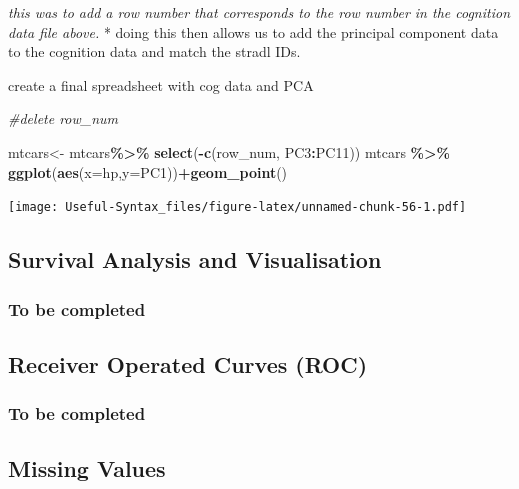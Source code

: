 \documentclass[
]{article}
\newenvironment{Shaded}{\begin{snugshade}}{\end{snugshade}}
\newcommand{\AttributeTok}[1]{\textcolor[rgb]{0.13,0.29,0.53}{#1}}
\newcommand{\CommentTok}[1]{\textcolor[rgb]{0.56,0.35,0.01}{\textit{#1}}}
\newcommand{\FunctionTok}[1]{\textcolor[rgb]{0.13,0.29,0.53}{\textbf{#1}}}
\newcommand{\NormalTok}[1]{#1}
\newcommand{\OtherTok}[1]{\textcolor[rgb]{0.56,0.35,0.01}{#1}}
\newcommand{\SpecialCharTok}[1]{\textcolor[rgb]{0.81,0.36,0.00}{\textbf{#1}}}
\begin{document}
\emph{this was to add a row number that corresponds to the row number in the cognition data file above.}
* doing this then allows us to add the principal component data to the cognition data and match the stradl IDs.

create a final spreadsheet with cog data and PCA

\begin{Shaded}
\begin{Highlighting}[]
\CommentTok{\#delete row\_num}

\NormalTok{mtcars}\OtherTok{\textless{}{-}}\NormalTok{ mtcars}\SpecialCharTok{\%\textgreater{}\%} \FunctionTok{select}\NormalTok{(}\SpecialCharTok{{-}}\FunctionTok{c}\NormalTok{(row\_num, PC3}\SpecialCharTok{:}\NormalTok{PC11))}
\NormalTok{mtcars }\SpecialCharTok{\%\textgreater{}\%} \FunctionTok{ggplot}\NormalTok{(}\FunctionTok{aes}\NormalTok{(}\AttributeTok{x=}\NormalTok{hp,}\AttributeTok{y=}\NormalTok{PC1))}\SpecialCharTok{+}\FunctionTok{geom\_point}\NormalTok{()}
\end{Highlighting}
\end{Shaded}

\texttt{[image: Useful-Syntax\_files/figure-latex/unnamed-chunk-56-1.pdf]}

\hypertarget{survival-analysis-and-visualisation}{%
\subsection{Survival Analysis and Visualisation}\label{survival-analysis-and-visualisation}}

\hypertarget{to-be-completed}{%
\subsubsection{To be completed}\label{to-be-completed}}

\hypertarget{receiver-operated-curves-roc}{%
\subsection{Receiver Operated Curves (ROC)}\label{receiver-operated-curves-roc}}

\hypertarget{to-be-completed-1}{%
\subsubsection{To be completed}\label{to-be-completed-1}}

\hypertarget{missing-values}{%
\subsection{Missing Values}\label{missing-values}}
\end{document}
